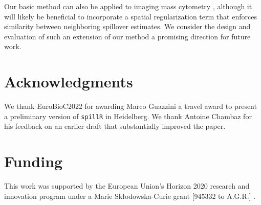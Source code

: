 \documentclass{bioinfo}
\begin{document}
Our basic method can also be applied to imaging mass cytometry
\citep{angelo2014multiplexed, giesen2014highly, bodenmiller2016multiplexed},
although it will likely be beneficial to incorporate a spatial
regularization term that enforces similarity between neighboring
spillover estimates. We consider the design and evaluation of such an
extension of our method a promising direction for future work.

\section*{Acknowledgments}

We thank EuroBioC2022 for awarding Marco Guazzini a travel award to
present a preliminary version of \texttt{spillR} in Heidelberg. We thank
Antoine Chambaz for his feedback on an earlier draft that substantially
improved the paper.

\section*{Funding}

This work was supported by the European Union's Horizon 2020 research
and innovation program under a Marie Sk\l{}odowska-Curie grant {[}945332
to A.G.R.{]} \euflag.




\end{document}
